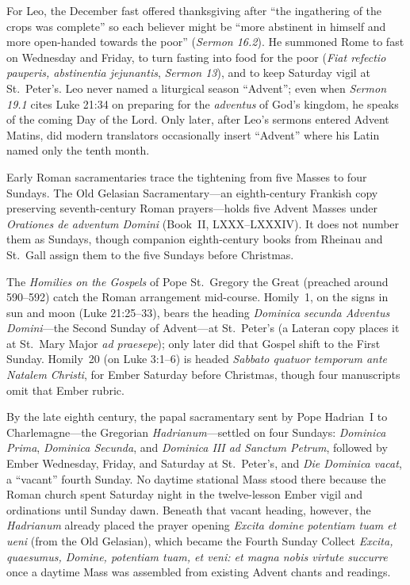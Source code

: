 For Leo, the December fast offered thanksgiving after ``the ingathering of
the crops was complete'' so each believer might be ``more abstinent in
himself and more open-handed towards the poor'' (\textit{Sermon 16.2}). He
summoned Rome to fast on Wednesday and Friday, to turn fasting into food
for the poor (\textit{Fiat refectio pauperis, abstinentia jejunantis},
\textit{Sermon 13}), and to keep Saturday vigil at St.~Peter's. Leo never
named a liturgical season ``Advent''; even when \textit{Sermon 19.1} cites
Luke 21:34 on preparing for the \textit{adventus} of God's kingdom, he
speaks of the coming Day of the Lord. Only later, after Leo's sermons
entered Advent Matins, did modern translators occasionally insert
``Advent'' where his Latin named only the tenth month.

Early Roman sacramentaries trace the tightening from five Masses to four
Sundays. The Old Gelasian Sacramentary---an eighth-century Frankish copy
preserving seventh-century Roman prayers---holds five Advent Masses under
\textit{Orationes de adventum Domini} (Book~II, LXXX--LXXXIV). It does not
number them as Sundays, though companion eighth-century books from Rheinau
and St.~Gall assign them to the five Sundays before Christmas.

The \textit{Homilies on the Gospels} of Pope St.~Gregory the Great
(preached around 590--592) catch the Roman arrangement mid-course.
Homily~1, on the signs in sun and moon (Luke 21:25--33), bears the heading
\textit{Dominica secunda Adventus Domini}---the Second Sunday of
Advent---at St.~Peter's (a Lateran copy places it at St.~Mary Major
\textit{ad praesepe}); only later did that Gospel shift to the First
Sunday. Homily~20 (on Luke 3:1--6) is headed \textit{Sabbato quatuor
temporum ante Natalem Christi}, for Ember Saturday before Christmas, though
four manuscripts omit that Ember rubric.

By the late eighth century, the papal sacramentary sent by Pope Hadrian~I
to Charlemagne---the Gregorian \textit{Hadrianum}---settled on four
Sundays: \textit{Dominica Prima}, \textit{Dominica Secunda}, and
\textit{Dominica III ad Sanctum Petrum}, followed by Ember Wednesday,
Friday, and Saturday at St.~Peter's, and \textit{Die Dominica vacat}, a
``vacant'' fourth Sunday. No daytime stational Mass stood there because the
Roman church spent Saturday night in the twelve-lesson Ember vigil and
ordinations until Sunday dawn. Beneath that vacant heading, however, the
\textit{Hadrianum} already placed the prayer opening \textit{Excita domine
potentiam tuam et ueni} (from the Old Gelasian), which became the Fourth
Sunday Collect \textit{Excita, quaesumus, Domine, potentiam tuam, et veni:
et magna nobis virtute succurre} once a daytime Mass was assembled from
existing Advent chants and readings.

